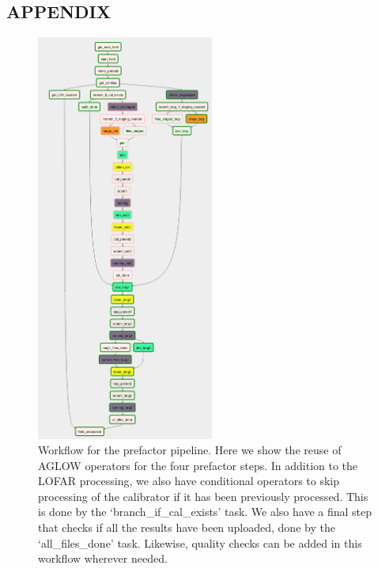 \begin{subappendices}

\section*{APPENDIX}
 
\begin{figure}[!ht]
 \centering
 \includegraphics[width=0.52\textwidth]{ch5/figures/SKSP_Dag1.png}
    \caption[Render of the DAG encoding the full prefactor pipeline.]{Workflow for the prefactor pipeline. Here we show the reuse of AGLOW operators for the four prefactor steps. In addition to the LOFAR processing, we also have conditional operators to skip processing of the calibrator if it has been previously processed. This is done by the `branch\_if\_cal\_exists' task. We also have a final step that checks if all the results have been uploaded, done by the `all\_files\_done' task. Likewise, quality checks can be added in this workflow wherever needed.}
 \label{SKSP_workflow}
\end{figure}


\end{subappendices}
